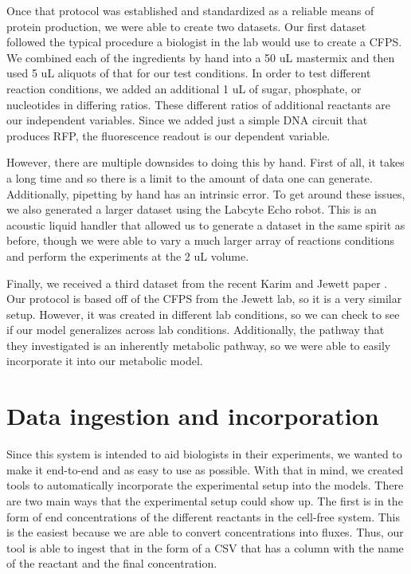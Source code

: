 
Once that protocol was established and standardized as a reliable means of protein production, we were able to create two datasets.
Our first dataset followed the typical procedure a biologist in the lab would use to create a CFPS.
We combined each of the ingredients by hand into a 50 uL mastermix and then used 5 uL aliquots of that for our test conditions.
In order to test different reaction conditions, we added an additional 1 uL of sugar, phosphate, or nucleotides in differing ratios.
These different ratios of additional reactants are our independent variables.
Since we added just a simple DNA circuit that produces RFP, the fluorescence readout is our dependent variable.

However, there are multiple downsides to doing this by hand.
First of all, it takes a long time and so there is a limit to the amount of data one can generate.
Additionally, pipetting by hand has an intrinsic error.
To get around these issues, we also generated a larger dataset using the Labcyte Echo robot.
This is an acoustic liquid handler that allowed us to generate a dataset in the same spirit as before, though we were able to vary a much larger array of reactions conditions and perform the experiments at the 2 uL volume.

Finally, we received a third dataset from the recent Karim and Jewett paper \cite{karim2018controlling}.
Our protocol is based off of the CFPS from the Jewett lab, so it is a very similar setup.
However, it was created in different lab conditions, so we can check to see if our model generalizes across lab conditions.
Additionally, the pathway that they investigated is an inherently metabolic pathway, so we were able to easily incorporate it into our metabolic model.

\section{Data ingestion and incorporation}
Since this system is intended to aid biologists in their experiments, we wanted to make it end-to-end and as easy to use as possible.
With that in mind, we created tools to automatically incorporate the experimental setup into the models.
There are two main ways that the experimental setup could show up.
The first is in the form of end concentrations of the different reactants in the cell-free system.
This is the easiest because we are able to convert concentrations into fluxes.
Thus, our tool is able to ingest that in the form of a CSV that has a column with the name of the reactant and the final concentration.

